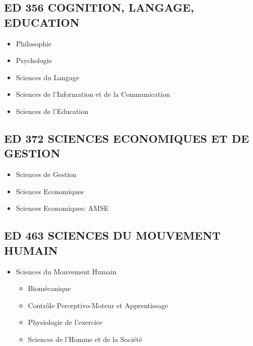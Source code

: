 \subsection*{ED 356 COGNITION, LANGAGE, EDUCATION}\label{ed-356-cognition-langage-education}

\begin{itemize}
\item Philosophie
\item Psychologie
\item Sciences du Langage
\item Sciences de l'Information et de la Communication
\item Sciences de l'Education
\end{itemize}

\subsection*{ED 372 SCIENCES ECONOMIQUES ET DE GESTION}\label{ed-372-sciences-economiques-et-de-gestion}

\begin{itemize}
\item Sciences de Gestion
\item Sciences Economiques
\item Sciences Economiques: AMSE
\end{itemize}

\subsection*{ED 463 SCIENCES DU MOUVEMENT HUMAIN}\label{ed-463-sciences-du-mouvement-humain}

\begin{itemize}
\item Sciences du Mouvement Humain
\begin{itemize}
\item Biomécanique
\item Contrôle Perceptivo-Moteur et Apprentissage
\item Physiologie de l'exercice
\item Sciences de l'Homme et de la Société
\end{itemize}
\end{itemize}
